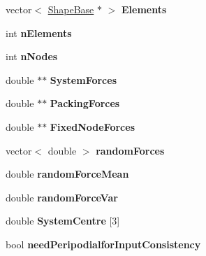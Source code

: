 \begin{DoxyCompactItemize}
\item 
\hypertarget{classSimulation_a7731565e1391398dc2f6bd8880719c46}{}vector$<$ \hyperlink{classShapeBase}{Shape\+Base} $\ast$ $>$ {\bfseries Elements}\label{classSimulation_a7731565e1391398dc2f6bd8880719c46}

\item 
\hypertarget{classSimulation_ac18b284c6a4474c0d60eac0eeda97264}{}int {\bfseries n\+Elements}\label{classSimulation_ac18b284c6a4474c0d60eac0eeda97264}

\item 
\hypertarget{classSimulation_aacf54ee7b6003ee9c2831535ff75422c}{}int {\bfseries n\+Nodes}\label{classSimulation_aacf54ee7b6003ee9c2831535ff75422c}

\item 
\hypertarget{classSimulation_a1619473071809021f1fa2c9ce4e51477}{}double $\ast$$\ast$ {\bfseries System\+Forces}\label{classSimulation_a1619473071809021f1fa2c9ce4e51477}

\item 
\hypertarget{classSimulation_acec3236063682570b72d3e2dc18c5cc7}{}double $\ast$$\ast$ {\bfseries Packing\+Forces}\label{classSimulation_acec3236063682570b72d3e2dc18c5cc7}

\item 
\hypertarget{classSimulation_a68cffb185d34cbab55ca97eb9b7d3fce}{}double $\ast$$\ast$ {\bfseries Fixed\+Node\+Forces}\label{classSimulation_a68cffb185d34cbab55ca97eb9b7d3fce}

\item 
\hypertarget{classSimulation_a3a08406cd0a73c828e49aa228a253b00}{}vector$<$ double $>$ {\bfseries random\+Forces}\label{classSimulation_a3a08406cd0a73c828e49aa228a253b00}

\item 
\hypertarget{classSimulation_a56b272cd63a24f903ab2378d71330e48}{}double {\bfseries random\+Force\+Mean}\label{classSimulation_a56b272cd63a24f903ab2378d71330e48}

\item 
\hypertarget{classSimulation_aa16edf4b6fbdfb5cbc953ecefb21620c}{}double {\bfseries random\+Force\+Var}\label{classSimulation_aa16edf4b6fbdfb5cbc953ecefb21620c}

\item 
\hypertarget{classSimulation_a3229dca48a5d49bbcd641f74605341c0}{}double {\bfseries System\+Centre} \mbox{[}3\mbox{]}\label{classSimulation_a3229dca48a5d49bbcd641f74605341c0}

\item 
\hypertarget{classSimulation_a31d908b8560f3da1a2524481c970449c}{}bool {\bfseries need\+Peripodialfor\+Input\+Consistency}\label{classSimulation_a31d908b8560f3da1a2524481c970449c}


\end{DoxyCompactItemize}
